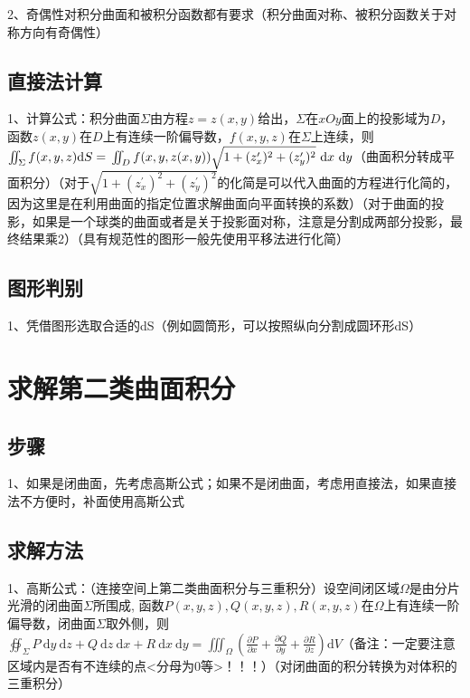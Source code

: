 2、奇偶性对积分曲面和被积分函数都有要求（积分曲面对称、被积分函数关于对称方向有奇偶性）



\subsection{直接法计算}

1、计算公式：积分曲面$\Sigma$由方程$z=z(x, y)$给出，$\Sigma$在$x O y$面上的投影域为$D$，函数$z(x, y)$在$D$上有连续一阶偏导数，$f(x, y, z)$在$\Sigma$上连续，则$\iint_{\Sigma} f(x, y, z) \mathrm{d} S=\newline\iint_{D} f(x, y, z(x, y)) \sqrt{1+(z_{x}^{\prime})^{2}+(z_{y}^{\prime})^{2}} \mathrm{~d} x \mathrm{~d} y$（曲面积分转成平面积分）（对于$\sqrt{1+\left(z_{x}^{\prime}\right)^{2}+\left(z_{y}^{\prime}\right)^{2}}$的化简是可以代入曲面的方程进行化简的，因为这里是在利用曲面的指定位置求解曲面向平面转换的系数）（对于曲面的投影，如果是一个球类的曲面或者是关于投影面对称，注意是分割成两部分投影，最终结果乘2）（具有规范性的图形一般先使用平移法进行化简）



\subsection{图形判别}

1、凭借图形选取合适的dS（例如圆筒形，可以按照纵向分割成圆环形dS）

\section{求解第二类曲面积分}



\subsection{步骤}

1、如果是闭曲面，先考虑高斯公式；如果不是闭曲面，考虑用直接法，如果直接法不方便时，补面使用高斯公式



\subsection{求解方法}

1、高斯公式：（连接空间上第二类曲面积分与三重积分）设空间闭区域$\Omega$是由分片光滑的闭曲面$\Sigma$所围成, 函数$P(x, y, z), Q(x, y, z), R(x, y, z)$在$\Omega$上有连续一阶偏导数，闭曲面$\Sigma$取外侧，则$\oiint_{\Sigma} P \mathrm{~d} y \mathrm{~d} z+Q \mathrm{~d} z \mathrm{~d} x+R \mathrm{~d} x \mathrm{~d} y=\iiint_{\Omega}\left(\frac{\partial P}{\partial x}+\frac{\partial Q}{\partial y}+\frac{\partial R}{\partial z}\right) \mathrm{d} V$（备注：一定要注意区域内是否有不连续的点<分母为0等>！！！）（对闭曲面的积分转换为对体积的三重积分）

